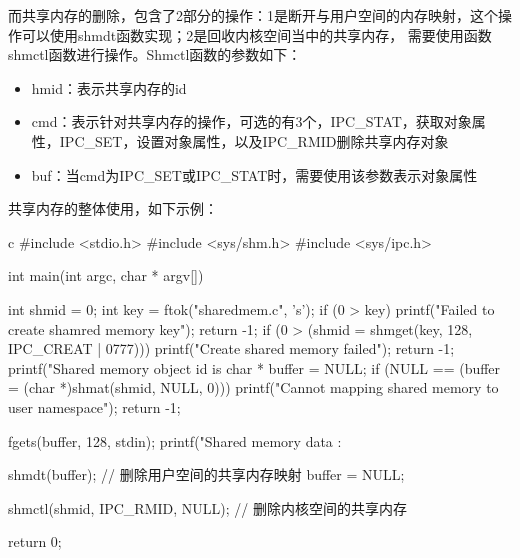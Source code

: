 而共享内存的删除，包含了2部分的操作：1是断开与用户空间的内存映射，这个操作可以使用shmdt函数实现；2是回收内核空间当中的共享内存，
需要使用函数shmctl函数进行操作。Shmctl函数的参数如下：
\begin{itemize}
  \item hmid：表示共享内存的id
  \item cmd：表示针对共享内存的操作，可选的有3个，IPC\_STAT，获取对象属性，IPC\_SET，设置对象属性，以及IPC\_RMID删除共享内存对象
  \item buf：当cmd为IPC\_SET或IPC\_STAT时，需要使用该参数表示对象属性
\end{itemize}

共享内存的整体使用，如下示例：
\begin{code-block}{c}
#include <stdio.h>
#include <sys/shm.h>
#include <sys/ipc.h>

int main(int argc, char * argv[])
{
        int shmid = 0;
        int key = ftok("sharedmem.c", 's');
        if (0 > key)
        {
                printf("Failed to create shamred memory key\n");
                return -1;
        }
        if (0 > (shmid = shmget(key, 128, IPC_CREAT | 0777)))
        {
                printf("Create shared memory failed\n");
                return -1;
        }
        printf("Shared memory object id is %
        char * buffer = NULL;
        if (NULL == (buffer = (char *)shmat(shmid, NULL, 0)))
        {
                printf("Cannot mapping shared memory to user namespace\n");
                return -1;
        }

        fgets(buffer, 128, stdin);
        printf("Shared memory data :%

        shmdt(buffer); // 删除用户空间的共享内存映射
        buffer = NULL;

        shmctl(shmid, IPC_RMID, NULL); // 删除内核空间的共享内存

        return 0;
}
\end{code-block}

